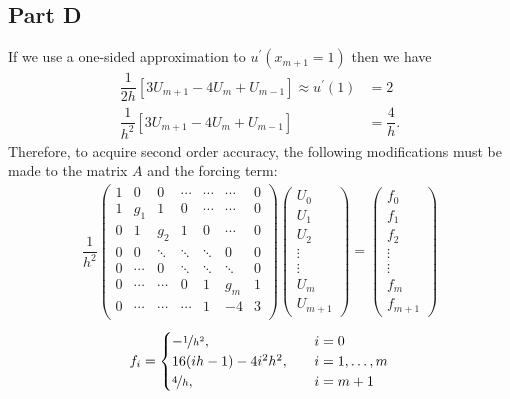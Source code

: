 \documentclass[12pt]{article}
\begin{document}
\subsection*{Part D}
If we use a one-sided approximation to $u^{\prime}(x_{m+1}=1)$ then we have
\begin{subequations}
    \begin{align}
         \dfrac{1}{2h}\left[3U_{m+1}-4U_{m}+U_{m-1}\right]  \approx u^{\prime}(1) &= 2\\
         \dfrac{1}{h^{2}}\left[3U_{m+1}-4U_{m}+U_{m-1}\right] &= \dfrac{4}{h}.
    \end{align}
\end{subequations}
Therefore, to acquire second order accuracy, the following modifications must be made to the matrix $A$ and the forcing term:
\begin{align}
    \dfrac{1}{h^{2}}
    \begin{pmatrix}
        1 & 0 & 0 & \cdots & \cdots & \cdots & 0\\
        1 & g_{1} & 1 & 0 & \cdots & \cdots &0 \\
        0 & 1 & g_{2} & 1 & 0 & \cdots & 0 \\
        0 & 0 & \ddots & \ddots & \ddots & 0 & 0 \\
        0 & \cdots & 0 & \ddots & \ddots & \ddots & 0  \\
        0 & \cdots & \cdots & 0 & 1 & g_{m} & 1\\
        0 & \cdots & \cdots & \cdots & 1 & -4 & 3\\
    \end{pmatrix}
    \begin{pmatrix}
        U_{0} \\ U_{1} \\ U_{2} \\ \vdots \\ \vdots \\ U_{m} \\ U_{m+1}
    \end{pmatrix}
    =
    \begin{pmatrix}
        f_{0} \\ f_{1} \\ f_{2} \\ \vdots \\ \vdots \\ f_{m} \\ f_{m+1}
    \end{pmatrix}
\end{align}
\begin{align}
    f_{i} =
    \begin{cases}
        -\nicefrac{1}{h^{2}},&\quad i = 0\\
        16(ih-1)-4i^{2}h^{2},&\quad i=1,\dots,m\\
        \nicefrac{4}{h},&\quad i = m+1
    \end{cases}
\end{align}
\end{document}
